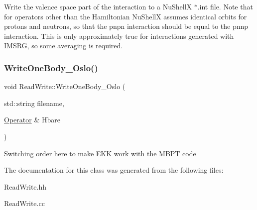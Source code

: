 Write the valence space part of the interaction to a Nu\+ShellX $\ast$.int file. Note that for operators other than the Hamiltonian Nu\+ShellX assumes identical orbits for protons and neutrons, so that the pnpn interaction should be equal to the pnnp interaction. This is only approximately true for interactions generated with I\+M\+S\+RG, so some averaging is required. \mbox{\label{classReadWrite_a9f2554cdd414e39fb19a49edff3d0b23}} 
\subsubsection{\texorpdfstring{Write\+One\+Body\+\_\+\+Oslo()}{WriteOneBody\_Oslo()}}
{\footnotesize\ttfamily void Read\+Write\+::\+Write\+One\+Body\+\_\+\+Oslo (\begin{DoxyParamCaption}\item[{std\+::string}]{filename,  }\item[{\hyperlink{classOperator}{Operator} \&}]{Hbare }\end{DoxyParamCaption})}

Switching order here to make E\+KK work with the M\+B\+PT code 

The documentation for this class was generated from the following files\+:\begin{DoxyCompactItemize}
\item 
Read\+Write.\+hh\item 
Read\+Write.\+cc\end{DoxyCompactItemize}
